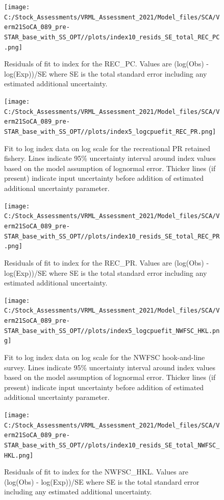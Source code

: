 \documentclass[
  english,
  a4paper,
]{article}
\begin{document}
\begin{figure}
\centering
\texttt{[image: C:/Stock\_Assessments/VRML\_Assessment\_2021/Model\_files/SCA/Verm21SoCA\_089\_pre-STAR\_base\_with\_SS\_OPT//plots/index10\_resids\_SE\_total\_REC\_PC.png]}
\caption{Residuals of fit to index for the REC\_PC. Values are (log(Obs) - log(Exp))/SE where SE is the total standard error including any estimated additional uncertainty.\label{fig:cpue-resid-REC-PC}}
\end{figure}

\begin{figure}
\centering
\texttt{[image: C:/Stock\_Assessments/VRML\_Assessment\_2021/Model\_files/SCA/Verm21SoCA\_089\_pre-STAR\_base\_with\_SS\_OPT//plots/index5\_logcpuefit\_REC\_PR.png]}
\caption{Fit to log index data on log scale for the recreational PR retained fishery. Lines indicate 95\% uncertainty interval around index values based on the model assumption of lognormal error. Thicker lines (if present) indicate input uncertainty before addition of estimated additional uncertainty parameter.\label{fig:log-cpue-REC-PR}}
\end{figure}

\begin{figure}
\centering
\texttt{[image: C:/Stock\_Assessments/VRML\_Assessment\_2021/Model\_files/SCA/Verm21SoCA\_089\_pre-STAR\_base\_with\_SS\_OPT//plots/index10\_resids\_SE\_total\_REC\_PR.png]}
\caption{Residuals of fit to index for the REC\_PR. Values are (log(Obs) - log(Exp))/SE where SE is the total standard error including any estimated additional uncertainty.\label{fig:cpue-resid-REC-PR}}
\end{figure}

\begin{figure}
\centering
\texttt{[image: C:/Stock\_Assessments/VRML\_Assessment\_2021/Model\_files/SCA/Verm21SoCA\_089\_pre-STAR\_base\_with\_SS\_OPT//plots/index5\_logcpuefit\_NWFSC\_HKL.png]}
\caption{Fit to log index data on log scale for the NWFSC hook-and-line survey. Lines indicate 95\% uncertainty interval around index values based on the model assumption of lognormal error. Thicker lines (if present) indicate input uncertainty before addition of estimated additional uncertainty parameter.\label{fig:log-cpue-NWFSC-HKL}}
\end{figure}

\begin{figure}
\centering
\texttt{[image: C:/Stock\_Assessments/VRML\_Assessment\_2021/Model\_files/SCA/Verm21SoCA\_089\_pre-STAR\_base\_with\_SS\_OPT//plots/index10\_resids\_SE\_total\_NWFSC\_HKL.png]}
\caption{Residuals of fit to index for the NWFSC\_HKL. Values are (log(Obs) - log(Exp))/SE where SE is the total standard error including any estimated additional uncertainty.\label{fig:cpue-resid-NWFSC-HKL}}
\end{figure}
\end{document}
